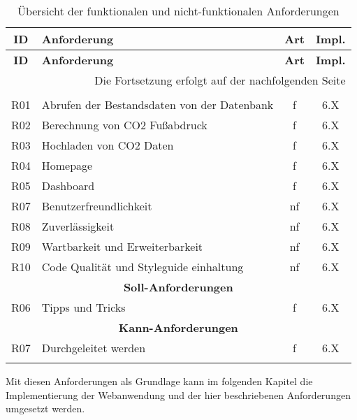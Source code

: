 \begin{longtable}{|c|l|c|c|}

    \hline
    \textbf{ID}          &
    \textbf{Anforderung} &
    \textbf{Art}         &
    \textbf{Impl.}                                                                \\ \hline
    \endfirsthead

    \hline
    \textbf{ID}          &
    \textbf{Anforderung} &
    \textbf{Art}         &
    \textbf{Impl.}                                                                \\ \hline
    \endhead

    \hline
    \multicolumn{4}{|r|}{{Die Fortsetzung erfolgt auf der nachfolgenden Seite}}   \\ \hline
    \endfoot

    \endlastfoot

    \multicolumn{4}{|c|}{\textbf{Muss-Anforderungen}}                             \\ \hline

    R01                  & Abrufen der Bestandsdaten von der Datenbank & f  & 6.X \\ \hline
    R02                  & Berechnung von CO2 Fußabdruck               & f  & 6.X \\ \hline
    R03                  & Hochladen von CO2 Daten                     & f  & 6.X \\ \hline
    R04                  & Homepage                                    & f  & 6.X \\ \hline
    R05                  & Dashboard                                   & f  & 6.X \\ \hline
    R07                  & Benutzerfreundlichkeit                      & nf & 6.X \\ \hline
    R08                  & Zuverlässigkeit                             & nf & 6.X \\ \hline
    R09                  & Wartbarkeit und Erweiterbarkeit             & nf & 6.X \\ \hline
    R10                  & Code Qualität und Styleguide einhaltung     & nf & 6.X \\ \hline

    \multicolumn{4}{|c|}{\textbf{Soll-Anforderungen}}                             \\ \hline

    R06                  & Tipps und Tricks                            & f  & 6.X \\ \hline

    \multicolumn{4}{|c|}{\textbf{Kann-Anforderungen}}                             \\ \hline

    R07                  & Durchgeleitet werden                        & f  & 6.X \\ \hline
    \caption{Übersicht der funktionalen und nicht-funktionalen Anforderungen}
    \\
\end{longtable}


Mit diesen Anforderungen als Grundlage kann im folgenden Kapitel die Implementierung der Webanwendung und der hier beschriebenen Anforderungen umgesetzt werden.
